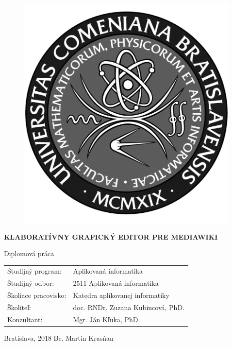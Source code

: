 \documentclass[12pt, a4paper, oneside]{book}
\newcommand\mftitle{Klaboratívny grafický editor pre MediaWiki}
\newcommand\mfthesistype{Diplomová práca}
\newcommand\mfauthor{Bc. Martin Krasňan}
\newcommand\mfconsultant{Mgr. Ján Kľuka, PhD.}
\newcommand\mfadvisor{doc. RNDr. Zuzana Kubincová, PhD.}
\newcommand\mfplacedate{Bratislava, 2018}
\begin{document}
\vfill
\begin{figure}[!hbt]
\begin{center}
\includegraphics{images/base/logo_fmph_dark}
\label{img:logo_dark}
\end{center}
\end{figure}
\begin{center}
\begin{minipage}{0.8\textwidth}
\centerline{\textbf{\Large\MakeUppercase{\mftitle}}}
\smallskip
\centerline{\mfthesistype}
\end{minipage}
\end{center}
\vfill
\begin{tabular}{l l}
Študijný program: & Aplikovaná informatika\\
Študijný odbor: & 2511 Aplikovaná informatika\\
Školiace pracovisko: & Katedra aplikovanej informatiky\\
Školiteľ: & \mfadvisor\\
Konzultant: & \mfconsultant
\end{tabular}
\vfill
\noindent
\mfplacedate \hfill
\mfauthor
\eject 
\end{document}
